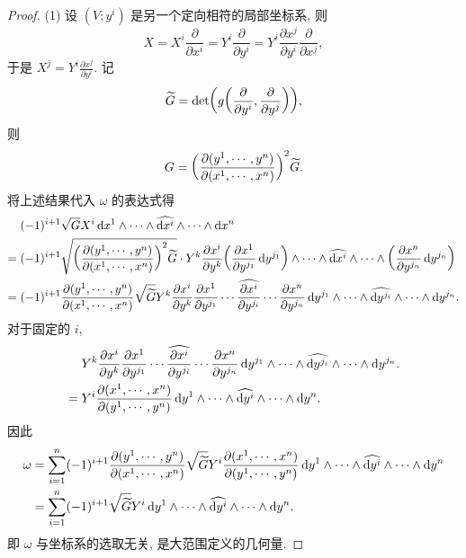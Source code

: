 \begin{proof}
  (1) 设 $(V;y^i)$ 是另一个定向相符的局部坐标系, 则
  \[X=X^i\frac{\partial}{\partial x^i}=Y^i\frac{\partial}{\partial y^i}
    =Y^i\frac{\partial x^j}{\partial y^i}\frac{\partial}{\partial x^j},\]
    于是 $X^j=Y^i\frac{\partial x^j}{\partial y^i}$. 记
    \[\widetilde{G} = \det\biggl(g\biggl(\pdv{y^i},\pdv{y^j}\biggr)\biggr),\]
    则
    \[G = \biggl(\pdv{(y^1,\cdots,y^n)}{(x^1,\cdots,x^n)}\biggr)^2\widetilde{G}.\]
    将上述结果代入 $\omega$ 的表达式得
    \begin{align*}
      & (-1)^{i+1} \sqrt{G}X^i\diff x^1\wedge\cdots\wedge\widehat{\diff x^i}\wedge\cdots\wedge\diff x^n \\
      ={} & (-1)^{i+1}\sqrt{\biggl(\frac{\partial(y^1,\cdots,y^n)}
        {\partial(x^1,\cdots,x^n)}\biggr)^2\widetilde{G}} \cdot Y^k\frac{\partial x^i}{\partial y^k}
        \biggl(\frac{\partial x^1}{\partial y^{j_1}}\diff y^{j_1}\biggr)
        \wedge\cdots\wedge\widehat{\diff x^i}\wedge\cdots\wedge
        \biggl(\frac{\partial x^n}{\partial y^{j_n}}\diff y^{j_n}\biggr) \\
      ={} & (-1)^{i+1}\frac{\partial(y^1,\cdots,y^n)}{\partial(x^1,\cdots,x^n)}
        \sqrt{\widetilde{G}}Y^k\frac{\partial x^i}{\partial y^k}
        \frac{\partial x^1}{\partial y^{j_1}}\cdots\widehat{\frac{\partial x^i}{\partial y^{j_i}}}
        \cdots\frac{\partial x^n}{\partial y^{j_n}}
        \diff y^{j_1}\wedge\cdots\wedge\widehat{\diff y^{j_i}}\wedge\cdots\wedge\diff y^{j_n}.
    \end{align*}
    对于固定的 $i$,
    \begin{align*}
      & Y^k\frac{\partial x^i}{\partial y^k}
        \frac{\partial x^1}{\partial y^{j_1}}\cdots\widehat{\frac{\partial x^i}{\partial y^{j_i}}}
        \cdots\frac{\partial x^n}{\partial y^{j_n}}
        \mathop{}\!\mathrm{d} y^{j_1}\wedge\cdots\wedge\widehat{\mathop{}\!\mathrm{d} y^{j_i}}\wedge\cdots\wedge\mathop{}\!\mathrm{d} y^{j_n}. \\
      ={} & Y^i \frac{\partial(x^1,\cdots,x^n)}{\partial(y^1,\cdots,y^n)}
        \mathop{}\!\mathrm{d} y^1\wedge\cdots\wedge\widehat{\mathop{}\!\mathrm{d} y^i}\wedge\cdots\wedge\mathop{}\!\mathrm{d} y^n.
    \end{align*}
    因此
    \begin{align*}
      \omega
      & = \sum_{i=1}^n (-1)^{i+1} \frac{\partial(y^1,\cdots,y^n)}{\partial(x^1,\cdots,x^n)}
        \sqrt{\widetilde{G}} Y^i \frac{\partial(x^1,\cdots,x^n)}{\partial(y^1,\cdots,y^n)}
        \mathop{}\!\mathrm{d} y^1\wedge\cdots\wedge\widehat{\mathop{}\!\mathrm{d} y^i}\wedge\cdots\wedge\mathop{}\!\mathrm{d} y^n \\
      & = \sum_{i=1}^n (-1)^{i+1} \sqrt{\widetilde{G}}Y^i \mathop{}\!\mathrm{d} y^1\wedge\cdots\wedge\widehat{\mathop{}\!\mathrm{d} y^i}\wedge\cdots\wedge\mathop{}\!\mathrm{d} y^n.
    \end{align*}
    即 $\omega$ 与坐标系的选取无关, 是大范围定义的几何量.


\end{proof}
